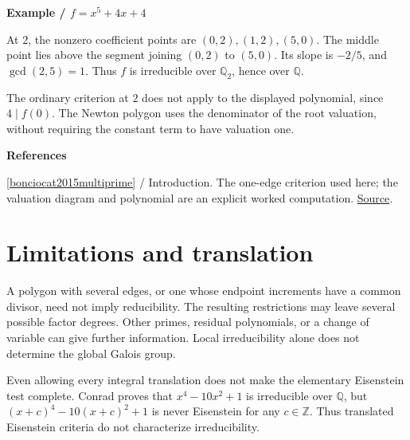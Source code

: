 \documentclass[11pt,a4paper,oneside,openany]{book}
\newenvironment{sources}{\par\smallskip\begingroup\footnotesize\color{atlasgray}\leftskip=10pt\setlength{\parskip}{2pt}}{\par\endgroup\smallskip}
\begin{document}
\begin{atlasblock}[standard]
\textbf{\sffamily Example  /  \(f=x^5+4x+4\)}\par\smallskip
\color{black} At \(2\), the nonzero coefficient points are \((0,2),(1,2),(5,0)\). The middle point lies above the segment joining \((0,2)\) to \((5,0)\). Its slope is \(-2/5\), and \(\gcd(2,5)=1\). Thus \(f\) is irreducible over \(\mathbb Q_2\), hence over \(\mathbb Q\).\par
\color{black} The ordinary criterion at \(2\) does not apply to the displayed polynomial, since \(4\mid f(0)\). The Newton polygon uses the denominator of the root valuation, without requiring the constant term to have valuation one.\par
\end{atlasblock}\color{black}
\begin{sources}
\textbf{References}\par\smallskip
\noindent\hyperlink{ref:bonciocat2015multiprime}{[bonciocat2015multiprime]} / Introduction. The one-edge criterion used here; the valuation diagram and polynomial are an explicit worked computation. \href{https://www.tandfonline.com/doi/abs/10.1080/00927872.2014.910800}{Source}.\par
\end{sources}\color{black}
\section{Limitations and translation}
\color{black} A polygon with several edges, or one whose endpoint increments have a common divisor, need not imply reducibility. The resulting restrictions may leave several possible factor degrees. Other primes, residual polynomials, or a change of variable can give further information. Local irreducibility alone does not determine the global Galois group.\par

\color{black} Even allowing every integral translation does not make the elementary Eisenstein test complete. Conrad proves that \(x^4-10x^2+1\) is irreducible over \(\mathbb Q\), but \((x+c)^4-10(x+c)^2+1\) is never Eisenstein for any \(c\in\mathbb Z\). Thus translated Eisenstein criteria do not characterize irreducibility.\par
\end{document}
